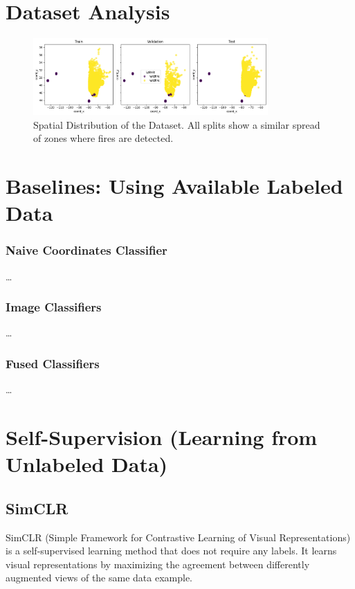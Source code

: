 \documentclass{article}
\begin{document}
\section{Dataset Analysis}

\begin{figure}
  \centering
  \includegraphics[width=0.8\textwidth]{figures/coord_label.png}
  \caption{Spatial Distribution of the Dataset. All splits show a similar spread of zones where fires are detected.}
  \label{fig:dataset_analysis}
\end{figure}

\section{Baselines: Using Available Labeled Data}

\subsubsection{Naive Coordinates Classifier}
\dots

\subsubsection{Image Classifiers}
\dots

\subsubsection{Fused Classifiers}
\dots

\section{Self-Supervision (Learning from Unlabeled Data)}

\subsection{SimCLR}
SimCLR (Simple Framework for Contrastive Learning of Visual Representations) is
a self-supervised learning method that does not require any labels. It learns
visual representations by maximizing the agreement between differently
augmented views of the same data example.
\end{document}
